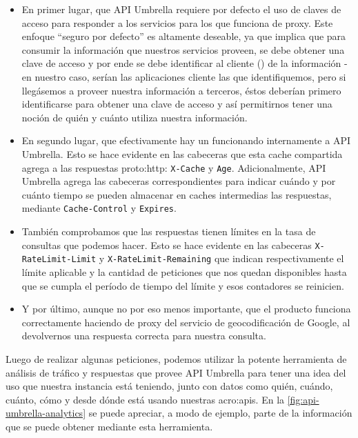 \begin{itemize}
  \item En primer lugar, que API Umbrella requiere por defecto el uso de claves de acceso para responder a los servicios para los que funciona de proxy. Este enfoque ``seguro por defecto'' es altamente deseable, ya que implica que para consumir la información que nuestros servicios proveen, se debe obtener una clave de acceso y por ende se debe identificar al cliente () de la información - en nuestro caso, serían las aplicaciones cliente las que identifiquemos, pero si llegásemos a proveer nuestra información a terceros, éstos deberían primero identificarse para obtener una clave de acceso y así permitirnos tener una noción de quién y cuánto utiliza nuestra información.
  \item En segundo lugar, que efectivamente hay un  funcionando internamente a API Umbrella. Esto se hace evidente en las cabeceras que esta cache compartida agrega a las respuestas \gls{proto:http}: \texttt{X-Cache} y \texttt{Age}. Adicionalmente, API Umbrella agrega las cabeceras correspondientes para indicar cuándo y por cuánto tiempo se pueden almacenar en caches intermedias las respuestas, mediante \texttt{Cache-Control} y \texttt{Expires}.
  \item También comprobamos que las respuestas tienen límites en la tasa de consultas que podemos hacer. Esto se hace evidente en las cabeceras \texttt{X-RateLimit-Limit} y \texttt{X-RateLimit-Remaining} que indican respectivamente el límite aplicable y la cantidad de peticiones que nos quedan disponibles hasta que se cumpla el período de tiempo del límite y esos contadores se reinicien.
  \item Y por último, aunque no por eso menos importante, que el producto funciona correctamente haciendo de proxy del servicio de geocodificación de Google, al devolvernos una respuesta correcta para nuestra consulta.
\end{itemize}

Luego de realizar algunas peticiones, podemos utilizar la potente herramienta de análisis de tráfico y respuestas que provee API Umbrella para tener una idea del uso que nuestra instancia está teniendo, junto con datos como quién, cuándo, cuánto, cómo y desde dónde está usando nuestras \glspl{acro:api}. En la \autoref{fig:api-umbrella-analytics} se puede apreciar, a modo de ejemplo, parte de la información que se puede obtener mediante esta herramienta.

